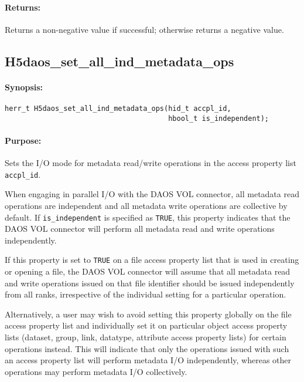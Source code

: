 \documentclass[../users_guide.tex]{subfiles}
\begin{document}
\paragraph{Returns:}
\begin{flushleft}%
Returns a non-negative value if successful; otherwise returns a negative value.
\end{flushleft}%

\newpage
\subsection{H5daos\_set\_all\_ind\_metadata\_ops}
\label{ref:h5daos_set_all_ind_metadata_ops}

\paragraph{Synopsis:}
\begin{flushleft}%
\begin{verbatim}
herr_t H5daos_set_all_ind_metadata_ops(hid_t accpl_id,
                                       hbool_t is_independent);
\end{verbatim}
\end{flushleft}%

\paragraph{Purpose:}
\begin{flushleft}%
Sets the I/O mode for metadata read/write operations in the access property list \texttt{accpl\_id}.

When engaging in parallel I/O with the DAOS VOL connector, all metadata read operations are
independent and all metadata write operations are collective by default. If \texttt{is\_independent} is
specified as \texttt{TRUE}, this property indicates that the DAOS VOL connector will perform all metadata
read and write operations independently.

If this property is set to \texttt{TRUE} on a file access property list that is used in creating or opening
a file, the DAOS VOL connector will assume that all metadata read and write operations issued on that file
identifier should be issued independently from all ranks, irrespective of the individual setting for a
particular operation.

Alternatively, a user may wish to avoid setting this property globally on the file access property list
and individually set it on particular object access property lists (dataset, group, link, datatype, attribute
access property lists) for certain operations instead. This will indicate that only the operations issued
with such an access property list will perform metadata I/O independently, whereas other operations may
perform metadata I/O collectively.  

\end{flushleft}%
\end{document}
